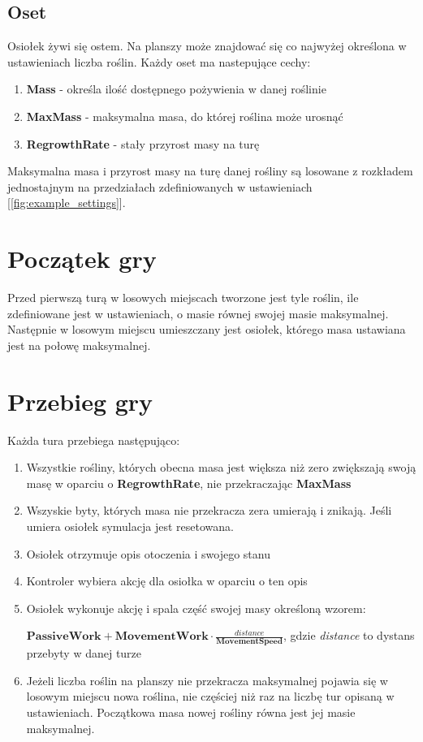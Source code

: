 \subsection{Oset}
Osiołek żywi się ostem. Na planszy może znajdować się co najwyżej określona w ustawieniach liczba roślin. Każdy oset ma nastepujące cechy:
\begin{enumerate}    
    \item \textbf{Mass} - określa ilość dostępnego pożywienia w danej roślinie
    \item \textbf{MaxMass} - maksymalna masa, do której roślina może urosnąć
    \item \textbf{RegrowthRate} - stały przyrost masy na turę
\end{enumerate}
Maksymalna masa i przyrost masy na turę danej rośliny są losowane z rozkładem jednostajnym na przedziałach zdefiniowanych w ustawieniach [\ref{fig:example_settings}].

\section{Początek gry}
Przed pierwszą turą w losowych miejscach tworzone jest tyle roślin, ile zdefiniowane jest w ustawieniach, o masie równej swojej masie maksymalnej. Następnie w losowym miejscu umieszczany jest osiołek, którego masa ustawiana jest na połowę maksymalnej.

\section{Przebieg gry}
Każda tura przebiega następująco:
\begin{enumerate}    
    \item Wszystkie rośliny, których obecna masa jest większa niż zero zwiększają swoją masę w oparciu o \textbf{RegrowthRate}, nie przekraczając \textbf{MaxMass}
    \item Wszyskie byty, których masa nie przekracza zera umierają i znikają. Jeśli umiera osiołek symulacja jest resetowana.
    \item Osiołek otrzymuje opis otoczenia i swojego stanu
    \item Kontroler wybiera akcję dla osiołka w oparciu o ten opis
    \item Osiołek wykonuje akcję i spala część swojej masy określoną wzorem:

     $\textbf{PassiveWork} + \textbf{MovementWork} \cdot \frac{\textit{distance}}{\textbf{MovementSpeed}}$, gdzie \textit{distance} to dystans przebyty w danej turze
    \item Jeżeli liczba roślin na planszy nie przekracza maksymalnej pojawia się w losowym miejscu nowa roślina, nie częściej niż raz na liczbę tur opisaną w ustawieniach. Początkowa masa nowej rośliny równa jest jej masie maksymalnej.
\end{enumerate}


